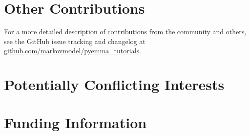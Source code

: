 \documentclass[9pt,tutorial,lineno,onehalfspacing]{livecoms}
\newcommand{\githubrepository}{\url{github.com/markovmodel/pyemma_tutorials}}
\begin{document}
\section{Other Contributions}
%
For a more detailed description of contributions from the community and others, see the GitHub issue tracking and changelog at \githubrepository.

\section{Potentially Conflicting Interests}

\section{Funding Information}




\end{document}
